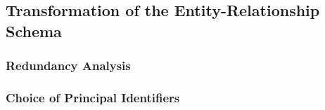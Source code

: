 \subsection{Transformation of the Entity-Relationship Schema}

\subsubsection{Redundancy Analysis}

\subsubsection{Choice of Principal Identifiers}
